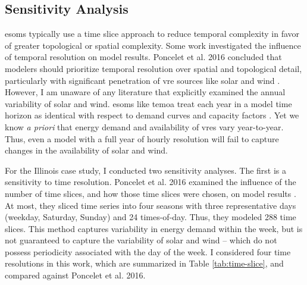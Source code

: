 


\subsection{Sensitivity Analysis}

\glspl{esom} typically use a time slice approach to reduce temporal complexity
in favor of greater topological or spatial complexity. Some work investigated the
influence of temporal resolution on model results. Poncelet et al. 2016
concluded that modelers should prioritize temporal resolution over spatial and
topological detail, particularly with significant penetration of \gls{vre}
sources like solar and wind \cite{poncelet_impact_2016}. However,
I am unaware of any literature that explicitly examined the annual variability
of solar and wind. \glspl{esom} like \gls{temoa} treat each year in a model
time horizon as identical with respect to demand curves and capacity factors
\cite{hunter_modeling_2013}. Yet
we know \textit{a priori} that energy demand and availability of \glspl{vre}
vary year-to-year. Thus, even a model with a full year of hourly resolution
will fail to capture changes in the availability of solar and wind.

For the Illinois case study, I conducted two sensitivity analyses. The first is a
sensitivity to time resolution. Poncelet et al. 2016 examined the influence of
the number of time slices, and how those time slices were chosen, on model results
\cite{poncelet_impact_2016}.
At most, they sliced time series into four seasons with three representative days (weekday,
Saturday, Sunday) and 24 times-of-day. Thus, they modeled 288 time slices. This
method captures variability in energy demand within the week, but is not guaranteed
to capture the variability of solar and wind -- which do not possess periodicity
associated with the day of the week. I considered four time resolutions in this work,
which are summarized in Table \ref{tab:time-slice}, and compared against Poncelet
et al. 2016.

